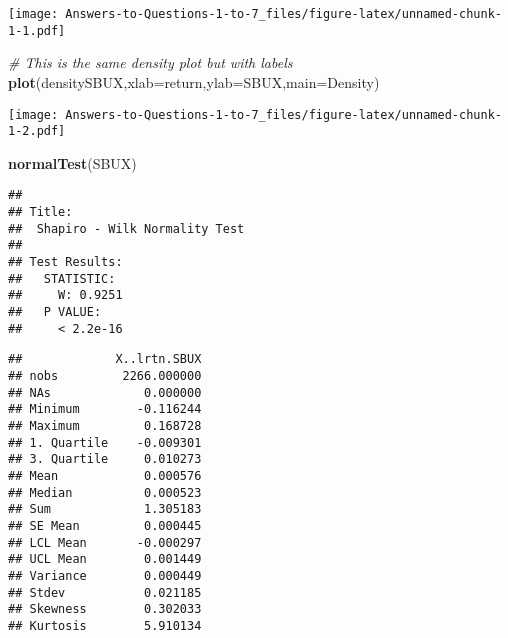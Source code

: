 \documentclass[
]{article}
\newenvironment{Shaded}{\begin{snugshade}}{\end{snugshade}}
\newcommand{\AttributeTok}[1]{\textcolor[rgb]{0.13,0.29,0.53}{#1}}
\newcommand{\CommentTok}[1]{\textcolor[rgb]{0.56,0.35,0.01}{\textit{#1}}}
\newcommand{\DecValTok}[1]{\textcolor[rgb]{0.00,0.00,0.81}{#1}}
\newcommand{\DocumentationTok}[1]{\textcolor[rgb]{0.56,0.35,0.01}{\textbf{\textit{#1}}}}
\newcommand{\FunctionTok}[1]{\textcolor[rgb]{0.13,0.29,0.53}{\textbf{#1}}}
\newcommand{\NormalTok}[1]{#1}
\newcommand{\OtherTok}[1]{\textcolor[rgb]{0.56,0.35,0.01}{#1}}
\newcommand{\SpecialCharTok}[1]{\textcolor[rgb]{0.81,0.36,0.00}{\textbf{#1}}}
\newcommand{\StringTok}[1]{\textcolor[rgb]{0.31,0.60,0.02}{#1}}
\begin{document}
\begin{Shaded}
\end{Shaded}

\texttt{[image: Answers-to-Questions-1-to-7\_files/figure-latex/unnamed-chunk-1-1.pdf]}

\begin{Shaded}
\begin{Highlighting}[]
\CommentTok{\# This is the same density plot but with labels}
\FunctionTok{plot}\NormalTok{(densitySBUX,}\AttributeTok{xlab=}\StringTok{\textquotesingle{}return\textquotesingle{}}\NormalTok{,}\AttributeTok{ylab=}\StringTok{\textquotesingle{}SBUX\textquotesingle{}}\NormalTok{,}\AttributeTok{main=}\StringTok{\textquotesingle{}Density\textquotesingle{}}\NormalTok{)}
\end{Highlighting}
\end{Shaded}

\texttt{[image: Answers-to-Questions-1-to-7\_files/figure-latex/unnamed-chunk-1-2.pdf]}

\begin{Shaded}
\begin{Highlighting}[]
\FunctionTok{normalTest}\NormalTok{(SBUX)}
\end{Highlighting}
\end{Shaded}

\begin{verbatim}
## 
## Title:
##  Shapiro - Wilk Normality Test
## 
## Test Results:
##   STATISTIC:
##     W: 0.9251
##   P VALUE:
##     < 2.2e-16
\end{verbatim}

\begin{Shaded}
\end{Shaded}

\begin{verbatim}
##             X..lrtn.SBUX
## nobs         2266.000000
## NAs             0.000000
## Minimum        -0.116244
## Maximum         0.168728
## 1. Quartile    -0.009301
## 3. Quartile     0.010273
## Mean            0.000576
## Median          0.000523
## Sum             1.305183
## SE Mean         0.000445
## LCL Mean       -0.000297
## UCL Mean        0.001449
## Variance        0.000449
## Stdev           0.021185
## Skewness        0.302033
## Kurtosis        5.910134
\end{verbatim}
\end{document}
